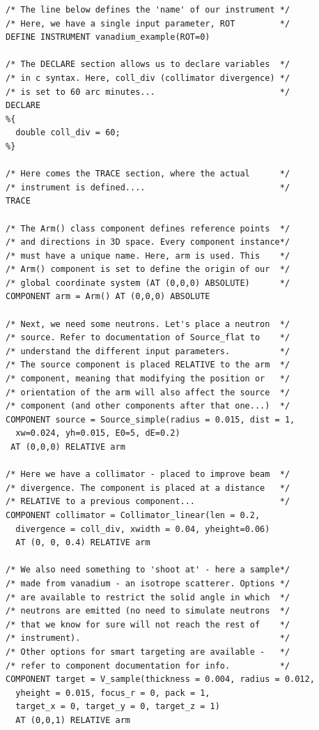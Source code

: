 \begin{verbatim}
/* The line below defines the 'name' of our instrument */
/* Here, we have a single input parameter, ROT         */
DEFINE INSTRUMENT vanadium_example(ROT=0)

/* The DECLARE section allows us to declare variables  */
/* in c syntax. Here, coll_div (collimator divergence) */
/* is set to 60 arc minutes...                         */
DECLARE
%{
  double coll_div = 60;
%}

/* Here comes the TRACE section, where the actual      */
/* instrument is defined....                           */
TRACE

/* The Arm() class component defines reference points  */
/* and directions in 3D space. Every component instance*/
/* must have a unique name. Here, arm is used. This    */
/* Arm() component is set to define the origin of our  */
/* global coordinate system (AT (0,0,0) ABSOLUTE)      */
COMPONENT arm = Arm() AT (0,0,0) ABSOLUTE

/* Next, we need some neutrons. Let's place a neutron  */
/* source. Refer to documentation of Source_flat to    */
/* understand the different input parameters.          */
/* The source component is placed RELATIVE to the arm  */
/* component, meaning that modifying the position or   */
/* orientation of the arm will also affect the source  */
/* component (and other components after that one...)  */
COMPONENT source = Source_simple(radius = 0.015, dist = 1,
  xw=0.024, yh=0.015, E0=5, dE=0.2)
 AT (0,0,0) RELATIVE arm

/* Here we have a collimator - placed to improve beam  */
/* divergence. The component is placed at a distance   */
/* RELATIVE to a previous component...                 */
COMPONENT collimator = Collimator_linear(len = 0.2, 
  divergence = coll_div, xwidth = 0.04, yheight=0.06)
  AT (0, 0, 0.4) RELATIVE arm

/* We also need something to 'shoot at' - here a sample*/
/* made from vanadium - an isotrope scatterer. Options */
/* are available to restrict the solid angle in which  */
/* neutrons are emitted (no need to simulate neutrons  */
/* that we know for sure will not reach the rest of    */
/* instrument).                                        */
/* Other options for smart targeting are available -   */
/* refer to component documentation for info.          */
COMPONENT target = V_sample(thickness = 0.004, radius = 0.012, 
  yheight = 0.015, focus_r = 0, pack = 1,
  target_x = 0, target_y = 0, target_z = 1)
  AT (0,0,1) RELATIVE arm


\end{verbatim}
